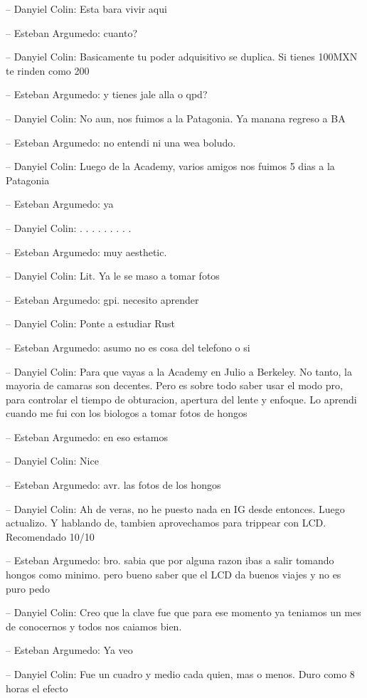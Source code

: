 -- Danyiel Colin: Esta bara vivir aqui

-- Esteban Argumedo: cuanto?

-- Danyiel Colin: Basicamente tu poder adquisitivo se duplica. Si tienes
100MXN te rinden como 200

-- Esteban Argumedo: y tienes jale alla o qpd?

-- Danyiel Colin: No aun, nos fuimos a la Patagonia. Ya manana regreso a
BA

-- Esteban Argumedo: no entendi ni una wea boludo.

-- Danyiel Colin: Luego de la Academy, varios amigos nos fuimos 5 dias a
la Patagonia

-- Esteban Argumedo: ya

-- Danyiel Colin: . . . . . . . . .

-- Esteban Argumedo: muy aesthetic.

-- Danyiel Colin: Lit. Ya le se maso a tomar fotos

-- Esteban Argumedo: gpi. necesito aprender

-- Danyiel Colin: Ponte a estudiar Rust

-- Esteban Argumedo: asumo no es cosa del telefono o si

-- Danyiel Colin: Para que vayas a la Academy en Julio a Berkeley. No
tanto, la mayoria de camaras son decentes. Pero es sobre todo saber usar
el modo pro, para controlar el tiempo de obturacion, apertura del lente
y enfoque. Lo aprendi cuando me fui con los biologos a tomar fotos de
hongos

-- Esteban Argumedo: en eso estamos

-- Danyiel Colin: Nice

-- Esteban Argumedo: avr. las fotos de los hongos

-- Danyiel Colin: Ah de veras, no he puesto nada en IG desde entonces.
Luego actualizo. Y hablando de, tambien aprovechamos para trippear con
LCD. Recomendado 10/10

-- Esteban Argumedo: bro. sabia que por alguna razon ibas a salir
tomando hongos como minimo. pero bueno saber que el LCD da buenos viajes
y no es puro pedo

-- Danyiel Colin: Creo que la clave fue que para ese momento ya teniamos
un mes de conocernos y todos nos caiamos bien.

-- Esteban Argumedo: Ya veo

-- Danyiel Colin: Fue un cuadro y medio cada quien, mas o menos. Duro
como 8 horas el efecto

